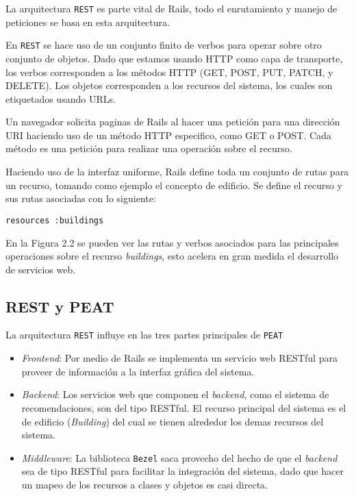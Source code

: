 La arquitectura \texttt{REST} es parte vital de Rails, todo el enrutamiento y
manejo de peticiones se basa en esta arquitectura.

En \texttt{REST} se hace uso de un conjunto finito de verbos para operar sobre otro
conjunto de objetos. Dado que estamos usando HTTP como capa de transporte, los
verbos corresponden a los métodos HTTP (GET, POST, PUT, PATCH, y DELETE).
Los objetos corresponden a los recursos del sistema, los cuales son etiquetados
usando URLs.

Un navegador solicita paginas de Rails al hacer una petición para una dirección URI
haciendo uso de un método HTTP especifico, como GET o POST. Cada método es una
petición para realizar una operación sobre el recurso.

Haciendo uso de la interfaz uniforme, Rails define toda un conjunto de rutas
para un recurso, tomando como ejemplo el concepto de edificio. Se define
el recurso y sus rutas asociadas con lo siguiente:

\begin{verbatim}
resources :buildings
\end{verbatim}

En la Figura 2.2 se pueden ver las rutas y verbos asociados para las principales
operaciones sobre el recurso \textit{buildings}, esto acelera en gran medida
el desarrollo de servicios web.


\subsection{REST y PEAT}
La arquitectura \texttt{REST} influye en las tres partes principales de \texttt{PEAT}

\begin{itemize}
\item \textit{Frontend}: Por medio de Rails se implementa un servicio web RESTful
  para proveer de información a la interfaz gráfica del sistema.
\item \textit{Backend}: Los servicios web que componen el \textit{backend}, como el
  sistema de recomendaciones, son del tipo RESTful. El recurso principal del sistema
  es el de edificio (\textit{Building}) del cual se tienen alrededor los demas
  recursos del sistema.
\item \textit{Middleware}: La biblioteca \texttt{Bezel} saca provecho del hecho
  de que el \textit{backend} sea de tipo RESTful para facilitar la integración del
  sistema,  dado que hacer un mapeo de los recursos a clases y objetos es
  casi directa.

\end{itemize}
